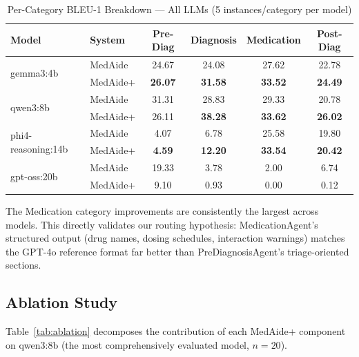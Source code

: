 \documentclass[conference]{IEEEtran}
\begin{document}
\begin{table}[t]
\centering
\caption{Per-Category BLEU-1 Breakdown — All LLMs (5 instances/category per model)}
\label{tab:percategory}
\setlength{\tabcolsep}{3pt}
\begin{tabular}{llcccc}
\toprule
\textbf{Model} & \textbf{System} & \textbf{Pre-Diag} & \textbf{Diagnosis} & \textbf{Medication} & \textbf{Post-Diag} \\
\midrule
\multirow{2}{*}{gemma3:4b}
  & MedAide  & 24.67 & 24.08 & 27.62 & 22.78 \\
  & MedAide+ & \textbf{26.07} & \textbf{31.58} & \textbf{33.52} & \textbf{24.49} \\
\midrule
\multirow{2}{*}{qwen3:8b}
  & MedAide  & 31.31 & 28.83 & 29.33 & 20.78 \\
  & MedAide+ & 26.11 & \textbf{38.28} & \textbf{33.62} & \textbf{26.02} \\
\midrule
\multirow{2}{*}{phi4-reasoning:14b}
  & MedAide  & 4.07 & 6.78 & 25.58 & 19.80 \\
  & MedAide+ & \textbf{4.59} & \textbf{12.20} & \textbf{33.54} & \textbf{20.42} \\
\midrule
\multirow{2}{*}{gpt-oss:20b}
  & MedAide  & 19.33 & 3.78 & 2.00 & 6.74 \\
  & MedAide+ & 9.10 & 0.93 & 0.00 & 0.12 \\
\bottomrule
\end{tabular}
\end{table}

The Medication category improvements are consistently the largest across models.
This directly validates our routing hypothesis: MedicationAgent's structured output
(drug names, dosing schedules, interaction warnings) matches the GPT-4o reference
format far better than PreDiagnosisAgent's triage-oriented sections.

\subsection{Ablation Study}
\label{sec:ablation}

Table~\ref{tab:ablation} decomposes the contribution of each MedAide+ component
on qwen3:8b (the most comprehensively evaluated model, $n{=}20$).
\end{document}
